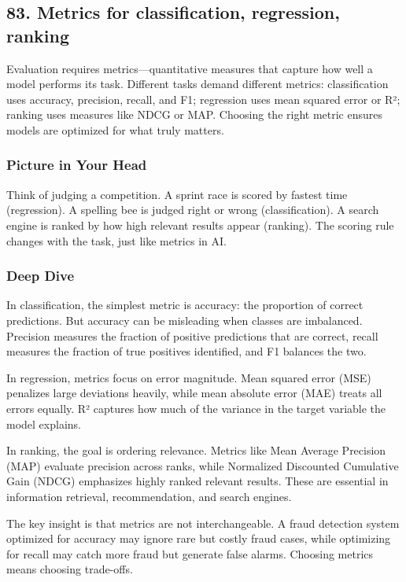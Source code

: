 \documentclass[
  letterpaper,
  DIV=11,
  numbers=noendperiod]{scrreprt}
\begin{document}
\subsection{83. Metrics for classification, regression,
ranking}\label{metrics-for-classification-regression-ranking}

Evaluation requires metrics---quantitative measures that capture how
well a model performs its task. Different tasks demand different
metrics: classification uses accuracy, precision, recall, and F1;
regression uses mean squared error or R²; ranking uses measures like
NDCG or MAP. Choosing the right metric ensures models are optimized for
what truly matters.

\subsubsection{Picture in Your Head}\label{picture-in-your-head-82}

Think of judging a competition. A sprint race is scored by fastest time
(regression). A spelling bee is judged right or wrong (classification).
A search engine is ranked by how high relevant results appear (ranking).
The scoring rule changes with the task, just like metrics in AI.

\subsubsection{Deep Dive}\label{deep-dive-82}

In classification, the simplest metric is accuracy: the proportion of
correct predictions. But accuracy can be misleading when classes are
imbalanced. Precision measures the fraction of positive predictions that
are correct, recall measures the fraction of true positives identified,
and F1 balances the two.

In regression, metrics focus on error magnitude. Mean squared error
(MSE) penalizes large deviations heavily, while mean absolute error
(MAE) treats all errors equally. R² captures how much of the variance in
the target variable the model explains.

In ranking, the goal is ordering relevance. Metrics like Mean Average
Precision (MAP) evaluate precision across ranks, while Normalized
Discounted Cumulative Gain (NDCG) emphasizes highly ranked relevant
results. These are essential in information retrieval, recommendation,
and search engines.

The key insight is that metrics are not interchangeable. A fraud
detection system optimized for accuracy may ignore rare but costly fraud
cases, while optimizing for recall may catch more fraud but generate
false alarms. Choosing metrics means choosing trade-offs.
\end{document}
